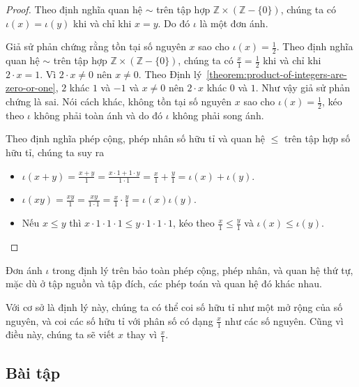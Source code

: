 \begin{proof}
    Theo định nghĩa quan hệ $\sim$ trên tập hợp $\mathbb{Z}\times (\mathbb{Z} - \{0\})$, chúng ta có $\iota(x) = \iota(y)$ khi và chỉ khi $x = y$. Do đó $\iota$ là một đơn ánh.

    Giả sử phản chứng rằng tồn tại số nguyên $x$ sao cho $\iota(x) = \frac{1}{2}$. Theo định nghĩa quan hệ $\sim$ trên tập hợp $\mathbb{Z}\times (\mathbb{Z} - \{0\})$, chúng ta có $\frac{x}{1} = \frac{1}{2}$ khi và chỉ khi $2\cdot x = 1$. Vì $2\cdot x\ne 0$ nên $x\ne 0$. Theo Định lý~\ref{theorem:product-of-integers-are-zero-or-one}, $2$ khác $1$ và $-1$ và $x\ne 0$ nên $2\cdot x$ khác $0$ và $1$. Như vậy giả sử phản chứng là sai. Nói cách khác, không tồn tại số nguyên $x$ sao cho $\iota(x) = \frac{1}{2}$, kéo theo $\iota$ không phải toàn ánh và do đó $\iota$ không phải song ánh.

    Theo định nghĩa phép cộng, phép nhân số hữu tỉ và quan hệ $\leq$ trên tập hợp số hữu tỉ, chúng ta suy ra
    \begin{itemize}
        \item $\iota(x + y) = \frac{x + y}{1} = \frac{x\cdot 1 + 1\cdot y}{1\cdot 1} = \frac{x}{1} + \frac{y}{1} = \iota(x) + \iota(y)$.
        \item $\iota(xy) = \frac{xy}{1} = \frac{xy}{1\cdot 1} = \frac{x}{1}\cdot\frac{y}{1} = \iota(x)\iota(y)$.
        \item Nếu $x\leq y$ thì $x\cdot 1\cdot 1\cdot 1\leq y\cdot 1\cdot 1\cdot 1$, kéo theo $\frac{x}{1}\leq \frac{y}{1}$ và $\iota(x)\leq \iota(y)$.
    \end{itemize}
\end{proof}

Đơn ánh $\iota$ trong định lý trên bảo toàn phép cộng, phép nhân, và quan hệ thứ tự, mặc dù ở tập nguồn và tập đích, các phép toán và quan hệ đó khác nhau.

Với cơ sở là định lý này, chúng ta có thể coi số hữu tỉ như một mở rộng của số nguyên, và coi các số hữu tỉ với phân số có dạng $\frac{x}{1}$ như các số nguyên. Cũng vì điều này, chúng ta sẽ viết $x$ thay vì $\frac{x}{1}$.

\subsection{Bài tập}
